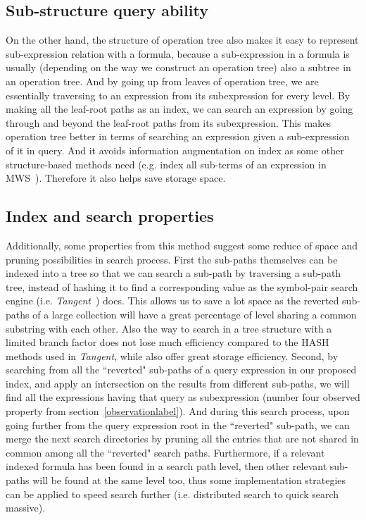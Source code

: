 \subsection{Sub-structure query ability}
On the other hand, the structure of operation tree also makes it easy to represent sub-expression relation with a formula, because a sub-expression in a formula is usually (depending on the way we construct an operation tree) also a subtree in an operation tree. 
And by going up from leaves of operation tree, we are essentially traversing to an expression from its subexpression for every level. 
By making all the leaf-root paths as an index, we can search an expression by going through and beyond the leaf-root paths from its subexpression. 
This makes operation tree better in terms of searching an expression given a sub-expression of it in query. 
And it avoids information augmentation on index as some other structure-based methods need (e.g. index all sub-terms of an expression in MWS~\cite{Kohlhase06}). Therefore it also helps save storage space. 

\subsection{Index and search properties}
Additionally, some properties from this method suggest some reduce of space and pruning possibilities in search process. 
First the sub-paths themselves can be indexed into a tree so that we can search a sub-path by traversing a sub-path tree, instead of hashing it to find a corresponding value as the symbol-pair search engine (i.e. \textit{Tangent}~\cite{symbolpairs15}) does. 
This allows us to save a lot space as the reverted sub-paths of a large collection will have a great percentage of level sharing a common substring with each other. 
Also the way to search in a tree structure with a limited branch factor does not lose much efficiency compared to the HASH methods used in \textit{Tangent}, while also offer great storage efficiency.
Second, by searching from all the ``reverted" sub-paths of a query expression in our proposed index, and apply an intersection on the results from different sub-paths, we will find all the expressions having that query as subexpression (number four observed property from section~\ref{observationlabel}). And during this search process, upon going further from the query expression root in the ``reverted" sub-path, we can merge the next search directories by pruning all the entries that are not shared in common among all the ``reverted" search paths. 
Furthermore, if a relevant indexed formula has been found in a search path level, then other relevant sub-paths will be found at the same level too, thus some implementation strategies can be applied to speed search further (i.e. distributed search to quick search massive).

